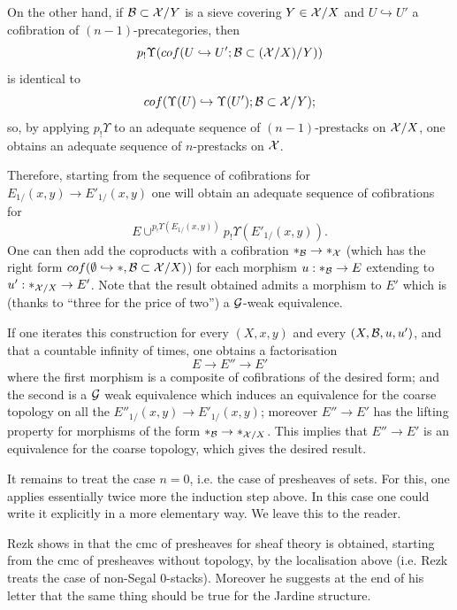 On the other hand, if ${\cal B} \subset {\cal X} /Y$ is a sieve covering $Y\in {\cal X} /X$
and $U\hookrightarrow U'$ a cofibration of $(n-1)$-precategories, then
$$
p_! \Upsilon (cof(U\hookrightarrow U'; {\cal B} \subset ({\cal X} /X) / Y))
$$
is identical to
$$
cof(\Upsilon (U)\hookrightarrow \Upsilon (U'); {\cal B} \subset {\cal X} /Y);
$$
so, by applying $p_!\Upsilon $ to an adequate sequence
of $(n-1)$-prestacks on ${\cal X} /X$, one obtains an adequate sequence
of
$n$-prestacks on ${\cal X}$.

Therefore, starting from the sequence of
cofibrations for $E_{1/} (x,y)\rightarrow E'_{1/}(x,y)$ one will obtain an
adequate sequence of cofibrations for
$$
E\cup ^{p_! \Upsilon (E_{1/} (x,y))}p_! \Upsilon (E'_{1/} (x,y)).
$$
One can then add
the coproducts with a cofibration $\ast _{{\cal B}} \rightarrow \ast
_{{\cal X}}$ (which has the right form
$cof (\emptyset \hookrightarrow \ast , {\cal B} \subset {\cal X} /X )$)
for each morphism $u:\ast _{{\cal B}} \rightarrow E$ extending to
$u':\ast _{{\cal X} /X}\rightarrow E'$.
Note that the result obtained admits a morphism to $E'$ which is
(thanks to ``three for the price of two'') a ${\cal G}$-weak equivalence.

If one iterates this construction for
every $(X,x,y)$ and every $(X,{\cal B} ,u,u')$, and that a countable infinity of
times, one
obtains a factorisation
$$
E\rightarrow E'' \rightarrow E'
$$
where the first morphism is a composite of cofibrations of the
desired form; and
the second is a ${\cal G}$ weak equivalence which induces an
equivalence for the coarse topology on all
the $E'' _{1/}(x,y)\rightarrow
E'_{1/}(x,y)$; moreover $E''\rightarrow E'$ has the lifting property
for morphisms of the form $\ast _{{\cal B}} \rightarrow \ast _{{\cal X} /X}$. This
implies that $E'' \rightarrow E'$ is an equivalence for the coarse
topology, which gives the desired result.

It remains to treat the case $n=0$, i.e. the case of presheaves of sets.
For this, one applies essentially twice more the induction step
above. In this case one could write it explicitly in a more
elementary way. We leave this to the reader.
\eop


Rezk shows in \cite{Rezk} that
the cmc of presheaves for sheaf theory is obtained,
starting from the cmc
of presheaves without topology, by the localisation above
(i.e. Rezk treats the case of non-Segal $0$-stacks). Moreover he suggests
at the end of his letter that the same thing should be true for the
Jardine structure.

